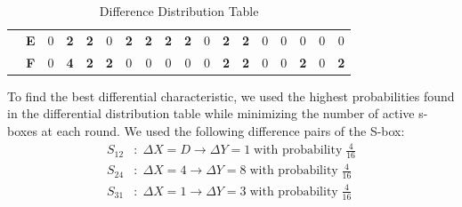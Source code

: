 \documentclass[letterpaper,12pt]{article}
\begin{document}
\begin{table}[h]
\begin{tabular}{|cc|cccccccccccccccc|}
                                                                                                                                                                                                                                                            & \textbf{E} & {\cellcolor[rgb]{0.902,0.902,0.902}}0  & {\cellcolor[rgb]{0.902,0.902,0.902}}\textbf{2} & {\cellcolor[rgb]{0.902,0.902,0.902}}\textbf{2} & {\cellcolor[rgb]{0.902,0.902,0.902}}0          & {\cellcolor[rgb]{0.902,0.902,0.902}}\textbf{2} & {\cellcolor[rgb]{0.902,0.902,0.902}}\textbf{2} & {\cellcolor[rgb]{0.902,0.902,0.902}}\textbf{2} & {\cellcolor[rgb]{0.902,0.902,0.902}}\textbf{2} & {\cellcolor[rgb]{0.902,0.902,0.902}}0          & {\cellcolor[rgb]{0.902,0.902,0.902}}\textbf{2} & {\cellcolor[rgb]{0.902,0.902,0.902}}\textbf{2} & {\cellcolor[rgb]{0.902,0.902,0.902}}0          & {\cellcolor[rgb]{0.902,0.902,0.902}}0          & {\cellcolor[rgb]{0.902,0.902,0.902}}0          & {\cellcolor[rgb]{0.902,0.902,0.902}}0          & {\cellcolor[rgb]{0.902,0.902,0.902}}0           \\
                                                                                                                                                                                                                                                            & \textbf{F} & 0                                      & \textbf{4}                                     & \textbf{2}                                     & \textbf{2}                                     & 0                                              & 0                                              & 0                                              & 0                                              & 0                                              & \textbf{2}                                     & \textbf{2}                                     & 0                                              & 0                                              & \textbf{2}                                     & 0                                              & \textbf{2}                                      \\
    \hline
    \end{tabular}
    \caption{Difference Distribution Table}
    \label{tab:ddt}
    \end{table}


To find the best differential characteristic, we used the highest probabilities found in the differential distribution table while minimizing the number of active s-boxes at each round. We used the following difference pairs of the S-box:
\begin{align*}
    S_{12}&: \; \Delta X = D \rightarrow \Delta Y = 1 \; \text{with probability} \; \frac{4}{16} \\
    S_{24}&: \; \Delta X = 4 \rightarrow \Delta Y = 8 \; \text{with probability} \; \frac{4}{16} \\
    S_{31}&: \; \Delta X = 1 \rightarrow \Delta Y = 3 \; \text{with probability} \; \frac{4}{16}
\end{align*}
\end{document}
